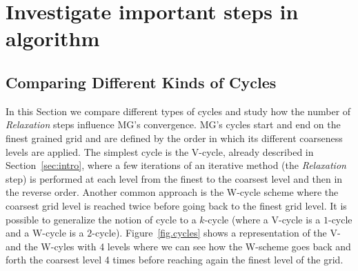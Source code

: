 \section{Investigate important steps in algorithm}
\label{sec:pruning}

\subsection{Comparing Different Kinds of Cycles}

In this Section we compare different types of cycles and study how the number of \textit{Relaxation} steps influence MG's convergence.
MG's cycles start and end on the finest grained grid and are defined by the order in which its different coarseness levels are applied.
The simplest cycle is the V-cycle, already described in Section~\ref{sec:intro}, where a few iterations
  of an iterative method (the \textit{Relaxation} step) is performed at each level from the finest to the coarsest level and then in the reverse order.
Another common approach is the W-cycle scheme where the coarsest grid level is reached twice before going back to the finest grid level.
It is possible to generalize the notion of cycle to a $k$-cycle (where a V-cycle is a $1$-cycle and a W-cycle is a $2$-cycle).
Figure~\ref{fig.cycles} shows a representation of the V- and the W-cyles with 4 levels where we can see how the W-scheme goes back and forth the coarsest level 4 times before reaching again the finest level of the grid.



